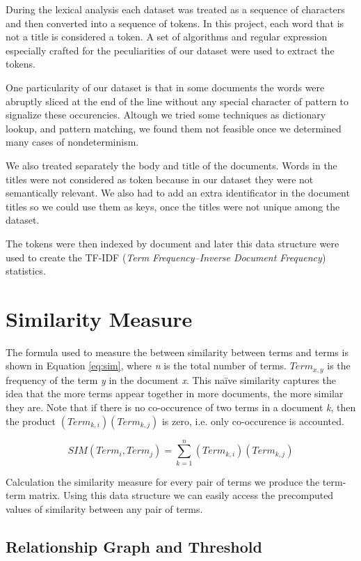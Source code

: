 \documentclass{article}
\begin{document}
During the lexical analysis each dataset was treated as a sequence of characters and then converted into a sequence of tokens. In this project, each word that is not a title is considered a token. A set of algorithms and regular expression especially crafted for the peculiarities of our dataset were used to extract the tokens.

One particularity of our dataset is that in some documents the words were abruptly sliced at the end of the line without any special character of pattern to signalize these occurencies. Altough we tried some techniques as dictionary lookup, and pattern matching, we found them not feasible once we determined many cases of nondeterminism.

We also treated separately the body and title of the documents. Words in the titles were not considered as token because in our dataset they were not semantically relevant. We also had to add an extra identificator in the document titles so we could use them as keys, once the titles were not unique among the dataset.

The tokens were then indexed by document and later this data structure were used to create  the TF-IDF (\emph{Term Frequency–Inverse Document Frequency}) statistics.

\section{Similarity Measure}

The formula used to measure the between similarity between terms and terms is shown in Equation \ref{eq:sim}, where \emph{n} is the total number of terms. $Term_{x,y}$ is the frequency of the term \emph{y} in the document \emph{x}. This naïve similarity captures the idea that the more terms appear together in more documents, the more similar they are. Note that if there is no co-occurence of two terms in a document \emph{k}, then the product $(Term_{k,i})(Term_{k,j})$ is zero, i.e. only co-occurence is accounted.

\begin{equation} \label{eq:sim}
SIM(Term_{i}, Term_{j}) = \sum\limits_{k=1}^n (Term_{k,i})(Term_{k,j})
\end{equation}

Calculation the similarity measure for every pair of terms we produce the term-term matrix. Using this data structure we can easily access the precomputed values of similarity between any pair of terms. 

\subsection{Relationship Graph and Threshold}
\end{document}
